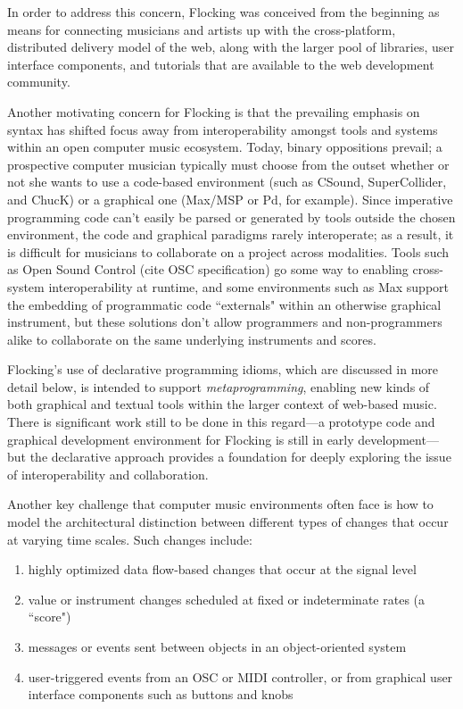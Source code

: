 \documentclass{article}
\begin{document}
In order to address this concern, Flocking was conceived from the beginning as means for connecting musicians and artists up with the cross-platform, distributed delivery model of the web, along with the larger pool of libraries, user interface components, and tutorials that are available to the web development community.

Another motivating concern for Flocking is that the prevailing emphasis on syntax has shifted focus away from interoperability amongst tools and systems within an open computer music ecosystem. Today, binary oppositions prevail; a prospective computer musician typically must choose from the outset whether or not she wants to use a code-based environment (such as CSound, SuperCollider, and ChucK) or a graphical one (Max/MSP or Pd, for example). Since imperative programming code can't easily be parsed or generated by tools outside the chosen environment, the code and graphical paradigms rarely interoperate; as a result, it is difficult for musicians to collaborate on a project across modalities. Tools such as Open Sound Control (cite OSC specification) go some way to enabling cross-system interoperability at runtime, and some environments such as Max support the embedding of programmatic code ``externals" within an otherwise graphical instrument, but these solutions don't allow programmers and non-programmers alike to collaborate on the same underlying instruments and scores.

Flocking's use of declarative programming idioms, which are discussed in more detail below, is intended to support {\it metaprogramming}, enabling new kinds of both graphical and textual tools within the larger context of web-based music. There is significant work still to be done in this regard---a prototype code and graphical development environment for Flocking is still in early development---but the declarative approach provides a foundation for deeply exploring the issue of interoperability and collaboration.

Another key challenge that computer music environments often face is how to model the architectural distinction between different types of changes that occur at varying time scales. Such changes include:

\begin{enumerate}
\item highly optimized data flow-based changes that occur at the signal level
\item value or instrument changes scheduled at fixed or indeterminate rates (a ``score")
\item messages or events sent between objects in an object-oriented system
\item user-triggered events from an OSC or MIDI controller, or from graphical user interface components such as buttons and knobs
\end{enumerate}
\end{document}
